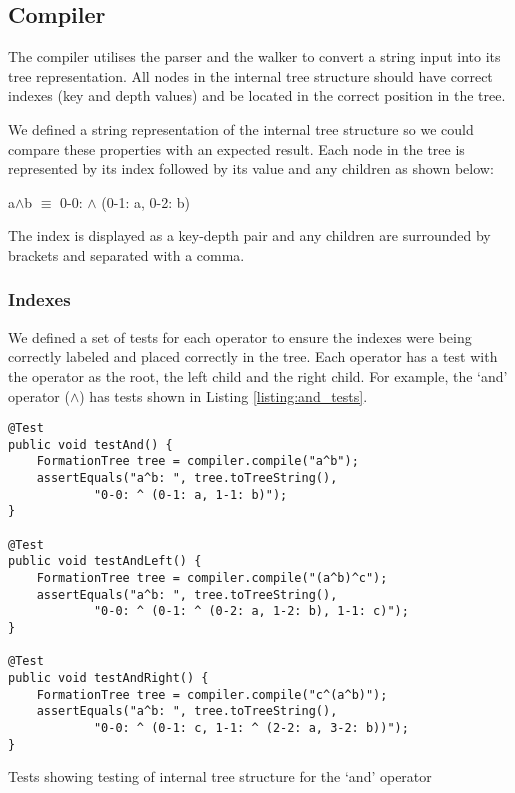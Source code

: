 \documentclass{report}
\begin{document}
\subsection{Compiler}

The compiler utilises the parser and the walker to convert a string input into its tree representation. All nodes in the internal tree structure should have correct indexes (key and depth values) and be located in the correct position in the tree.

We defined a string representation of the internal tree structure so we could compare these properties with an expected result. Each node in the tree is represented by its index followed by its value and any children as shown below:

\begin{center}
a$\land$b $\equiv$ 0-0: $\land$ (0-1: a, 0-2: b)
\end{center}

The index is displayed as a key-depth pair and any children are surrounded by brackets and separated with a comma.

\subsubsection{Indexes}

We defined a set of tests for each operator to ensure the indexes were being correctly labeled and placed correctly in the tree. Each operator has a test with the operator as the root, the left child and the right child. For example, the `and' operator ($\land$) has tests shown in Listing \ref{listing:and_tests}.

\begin{listing}[ht]
\begin{verbatim}
@Test
public void testAnd() {
    FormationTree tree = compiler.compile("a^b");
    assertEquals("a^b: ", tree.toTreeString(), 
            "0-0: ^ (0-1: a, 1-1: b)");
}

@Test
public void testAndLeft() {
    FormationTree tree = compiler.compile("(a^b)^c");
    assertEquals("a^b: ", tree.toTreeString(), 
            "0-0: ^ (0-1: ^ (0-2: a, 1-2: b), 1-1: c)");
}

@Test
public void testAndRight() {
    FormationTree tree = compiler.compile("c^(a^b)");
    assertEquals("a^b: ", tree.toTreeString(), 
            "0-0: ^ (0-1: c, 1-1: ^ (2-2: a, 3-2: b))");
}
\end{verbatim}
\caption{Tests showing testing of internal tree structure for the `and' operator}
\label{listing:and_tests}
\end{listing}
\end{document}
